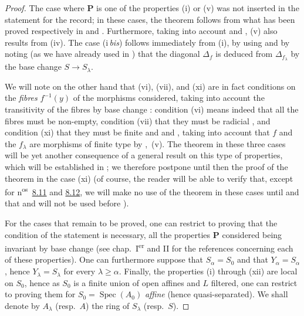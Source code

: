 \begin{proof}
The case where $\mathbf{P}$ is one of the properties (i) or (v) was not inserted in the statement for the record; in these cases, the theorem follows from what has been proved respectively in  and .
Furthermore, taking into account  and , (v) also results from (iv).
The case (i\,\emph{bis}) follows immediately from (i), by using  and by noting (as we have already used in ) that the diagonal $\Delta_f$ is deduced from $\Delta_{f_\lambda}$ by the base change $S\to S_\lambda$.

We will note on the other hand that (vi), (vii), and (xi) are in fact conditions on the \emph{fibres} $f^{-1}(y)$ of the morphisms considered, taking into account the transitivity of the fibres by base change : condition (vi) means indeed that all the fibres must be non-empty, condition (vii) that they must be radicial , and condition (xi) that they must be finite  and  and , taking into account that $f$ and the $f_\lambda$ are morphisms of finite type by ,~(v).
The theorem in these three cases will be yet another consequence of a general result on this type of properties, which will be established in ; we therefore postpone until then the proof of the theorem in the case (xi) (of course, the reader will be able to verify that, except for n\textsuperscript{os}~{\hyperlink{ega4.c04.subsec.8-11}{8.11}} and {\hyperlink{ega4.c04.subsec.8-12}{8.12}}, we will make no use of the theorem in these cases until  and that  and  will not be used before ).

For the cases that remain to be proved, one can restrict to proving that the condition of the statement is necessary, all the properties $\mathbf{P}$ considered being invariant by base change (see chap.~I\textsuperscript{er} and II for the references concerning each of these properties).
One can furthermore suppose that $S_\alpha=S_0$ and that $Y_\alpha=S_\alpha$, hence $Y_\lambda=S_\lambda$ for every $\lambda\geqslant\alpha$.
Finally, the properties (i) through (xii) are local on $S_0$, hence as $S_0$ is a finite union of open affines and $L$ filtered, one can restrict to proving them for $S_0=\operatorname{Spec}(A_0)$ \emph{affine} (hence quasi-separated).
We shall denote by $A_\lambda$ (resp.\ $A$) the ring of $S_\lambda$ (resp.\ $S$).


\end{proof}
